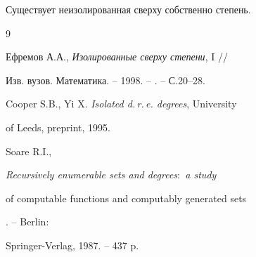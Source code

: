 \begin{cor}


Существует неизолированная сверху собственно \re{} степень.


\end{cor}





\begin{thebibliography}{9}







Ефремов А.А., {\em Изолированные сверху \re{} степени}, I //


Изв. вузов. Математика. -- 1998. -- . -- С.20--28.




Cooper S.B., Yi X. {\em Isolated d.\,r.\,e. degrees}, University


of Leeds, preprint, 1995.




Soare R.I., {\em Recursively enumerable sets and degrees$:$ a study


of computable functions and computably generated sets}. -- Berlin:


Springer-Verlag, 1987. -- 437 p.





\end{thebibliography}





\vskip 0.5cm












\label{end}





